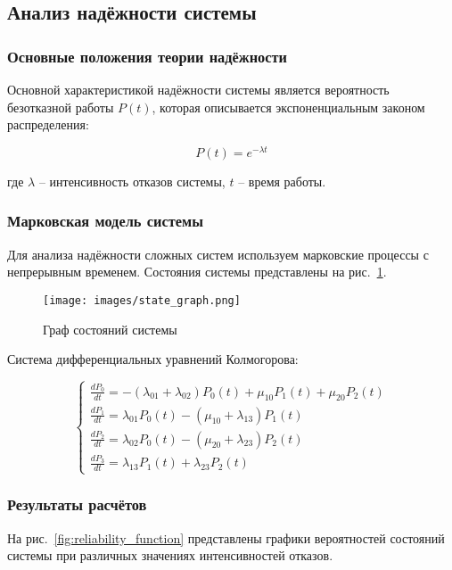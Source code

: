 \subsection{Анализ надёжности системы}\label{sec:reliability}

\subsubsection{Основные положения теории надёжности}
Основной характеристикой надёжности системы является вероятность безотказной работы $P(t)$, которая описывается экспоненциальным законом распределения:

\begin{equation}
P(t) = e^{-\lambda t}
\end{equation}

где $\lambda$ -- интенсивность отказов системы, $t$ -- время работы.

\subsubsection{Марковская модель системы}
Для анализа надёжности сложных систем используем марковские процессы с непрерывным временем. Состояния системы представлены на рис.\ \ref{fig:state_graph}.

\begin{figure}[H]
\centering
\texttt{[image: images/state\_graph.png]}
\caption{Граф состояний системы}
\label{fig:state_graph}
\end{figure}

Система дифференциальных уравнений Колмогорова:

\begin{equation}
\begin{cases}
\frac{dP_0}{dt} = -(\lambda_{01} + \lambda_{02})P_0(t) + \mu_{10}P_1(t) + \mu_{20}P_2(t) \\
\frac{dP_1}{dt} = \lambda_{01}P_0(t) - (\mu_{10} + \lambda_{13})P_1(t) \\
\frac{dP_2}{dt} = \lambda_{02}P_0(t) - (\mu_{20} + \lambda_{23})P_2(t) \\
\frac{dP_3}{dt} = \lambda_{13}P_1(t) + \lambda_{23}P_2(t)
\end{cases}
\end{equation}

\subsubsection{Результаты расчётов}
На рис.\ \ref{fig:reliability_function} представлены графики вероятностей состояний системы при различных значениях интенсивностей отказов.


